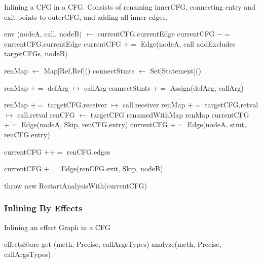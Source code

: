 \documentclass[a4paper]{article}
\begin{document}
\begin{algorithm}
\caption{Inlining a CFG in a CFG. Consists of renaming innerCFG, connecting
entry and exit points to outerCFG, and adding all inner
edges.}\label{algo:pt:inlinebycfg}
\begin{algorithmic}[1]
        \State \Return env
    \Else
        \State (nodeA, call, nodeB) $\gets$ currentCFG.currentEdge
        \State currentCFG $-=$ currentCFG.currentEdge
        \State currentCFG $+=$ Edge(nodeA, call addExcludes targetCFGs, nodeB)

            \State renMap $\gets$ Map[Ref,Ref]()
            \State connectStmts $\gets$ Set[Statement]()
            \State

                    \State renMap $+=$ defArg $\mapsto$ callArg
                \Else
                    \State connectStmts $+=$ Assign(defArg, callArg)
                \EndIf

            \EndFor
            \State
            \State renMap $+=$ targetCFG.receiver $\mapsto$ call.receiver
            \State renMap $+=$ targetCFG.retval   $\mapsto$ call.retval
            \State
            \State renCFG $\gets$ targetCFG renamedWithMap renMap
            \State
                \State currentCFG $+=$ Edge(nodeA, Skip, renCFG.entry)
            \Else
                    \State currentCFG $+=$ Edge(nodeA, stmt, renCFG.entry)
                \EndFor
            \EndIf

            \State currentCFG $++=$ renCFG.edges

            \State currentCFG $+=$ Edge(renCFG.exit, Skip, nodeB)
        \EndFor

        \State throw new RestartAnalysisWith(currentCFG)
    \EndIf
\EndFunction
\end{algorithmic}
\end{algorithm}

\FloatBarrier

\subsubsection{Inlining By Effects}

\begin{algorithm}
\caption{Inlining an effect Graph in a CFG}\label{algo:pt:inlinebyeffect}
\begin{algorithmic}[1]
        \State \Return effectsStore get (meth, Precise, callArgsTypes)
    \Else
        \State \Return analyze(meth, Precise, callArgsTypes)
    \EndIf
\EndFunction
\end{algorithmic}
\end{algorithm}
\end{document}
